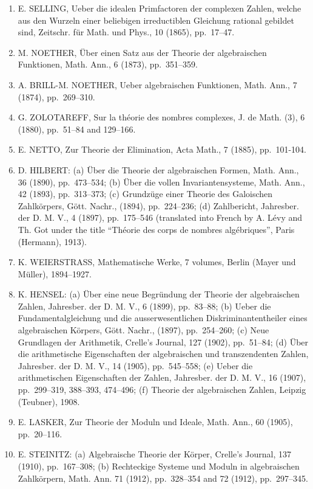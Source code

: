 \begin{enumerate}
\def\labelenumi{\arabic{enumi}.}
\setcounter{enumi}{10}
\item
  E. SELLING, Ueber die idealen Primfactoren der complexen Zahlen, welche aus den Wurzeln einer beliebigen irreductiblen Gleichung rational gebildet sind, Zeitschr. für Math. und Phys., 10 (1865), pp.~17--47.
\item
  M. NOETHER, Über einen Satz aus der Theorie der algebraischen Funktionen, Math. Ann., 6 (1873), pp.~351--359.
\item
  A. BRILL-M. NOETHER, Ueber algebraischen Funktionen, Math. Ann., 7 (1874), pp.~269--310.
\item
  G. ZOLOTAREFF, Sur la théorie des nombres complexes, J. de Math. (3), 6 (1880), pp.~51--84 and 129--166.
\item
  E. NETTO, Zur Theorie der Elimination, Acta Math., 7 (1885), pp.~101-104.
\item
  D. HILBERT: (a) Über die Theorie der algebraischen Formen, Math. Ann., 36 (1890), pp.~473--534; (b) Über die vollen Invariantensysteme, Math. Ann., 42 (1893), pp.~313--373; (c) Grundzüge einer Theorie des Galoischen Zahlkörpers, Gött. Nachr., (1894), pp.~224--236; (d) Zahlbericht, Jahresber. der D. M. V., 4 (1897), pp.~175--546 (translated into French by A. Lévy and Th. Got under the title ``Théorie des corps de nombres algébriques'', Paris (Hermann), 1913).
\item
  K. WEIERSTRASS, Mathematische Werke, 7 volumes, Berlin (Mayer und Müller), 1894--1927.
\item
  K. HENSEL: (a) Über eine neue Begründung der Theorie der algebraischen Zahlen, Jahresber. der D. M. V., 6 (1899), pp.~83--88; (b) Ueber die Fundamentalgleichung und die ausserwesentlichen Diskriminantentheiler eines algebraischen Körpers, Gött. Nachr., (1897), pp.~254--260; (c) Neue Grundlagen der Arithmetik, Crelle's Journal, 127 (1902), pp.~51--84; (d) Über die arithmetische Eigenschaften der algebraischen und transzendenten Zahlen, Jahresber. der D. M. V., 14 (1905), pp.~545--558; (e) Ueber die arithmetischen Eigenschaften der Zahlen, Jahresber. der D. M. V., 16 (1907), pp.~299--319, 388--393, 474--496; (f) Theorie der algebraischen Zahlen, Leipzig (Teubner), 1908.
\item
  E. LASKER, Zur Theorie der Moduln und Ideale, Math. Ann., 60 (1905), pp.~20--116.
\item
  E. STEINITZ: (a) Algebraische Theorie der Körper, Crelle's Journal, 137 (1910), pp.~167--308; (b) Rechteckige Systeme und Moduln in algebraischen Zahlkörpern, Math. Ann. 71 (1912), pp.~328--354 and 72 (1912), pp.~297--345.

\end{enumerate}
